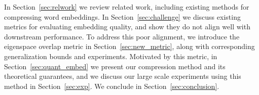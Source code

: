 In Section~\ref{sec:relwork} we review related work, including existing methods for compressing word embeddings.
In Section~\ref{sec:challenge} we discuss existing metrics for evaluating embedding quality, and show they do not align well with downstream performance.
To address this poor alignment, we introduce the eigenspace overlap metric in Section~\ref{sec:new_metric}, along with corresponding generalization bounds and experiments.
Motivated by this metric, in Section~\ref{sec:quant_embed} we present our compression method and its theoretical guarantees, and we discuss our large scale experiments using this method in Section~\ref{sec:exp}.
We conclude in Section~\ref{sec:conclusion}.


%
%
